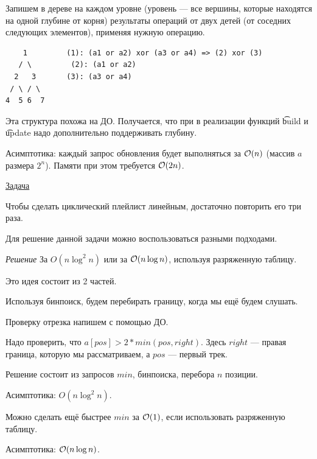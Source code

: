 Запишем в дереве на каждом уровне (уровень --- все вершины, которые находятся на одной глубине от корня) результаты операций от двух детей (от соседних следующих элементов), применяя нужную операцию.

\begin{verbatim}
    1         (1): (a1 or a2) xor (a3 or a4) => (2) xor (3)
   / \	       (2): (a1 or a2) 
  2   3       (3): (a3 or a4)
 / \ / \
4  5 6  7      
\end{verbatim}

Эта структура похожа на ДО. Получается, что при в реализации функций \t{build} и \t{update} надо дополнительно поддерживать глубину.

Асимптотика: каждый запрос обновления будет выполняться за $\mathcal{O}(n)$ (массив $a$ размера $2^n$). Памяти при этом требуется $\mathcal{O}(2n)$.

\pagebreak


\href{https://codeforces.com/problemset/problem/1237/D}{Задача}

Чтобы сделать циклический плейлист линейным, достаточно повторить его три раза.

Для решение данной задачи можно воспользоваться разными подходами. 

{\it Решение } За $O(n \log^2 n)$ или за $\mathcal{O}(n \log n)$, используя разряженную таблицу.

Это идея состоит из 2 частей.
\up \up
\begin{MyList}[0pt]
	\item Используя бинпоиск, будем перебирать границу, когда мы ещё будем слушать.
	\item Проверку отрезка напишем с помощью ДО.
	
	Надо проверить, что $a[pos] > 2 * min(pos, right)$. Здесь $right$ --- правая граница, которую мы рассматриваем, а $pos$ --- первый трек.
\end{MyList}
\up \up
Решение состоит из запросов $min$, бинпоиска, перебора $n$ позиции.

Асимптотика: $O(n \log^2 n)$.
\down

Можно сделать ещё быстрее $min$ за $\mathcal{O}(1)$, если использовать разряженную таблицу.

Асимптотика: $\mathcal{O}(n \log n)$. \href{https://codeforces.com/contest/1237/submission/62698504}{} \href{https://codeforces.com/contest/1237/submission/63401681}{}

\down

